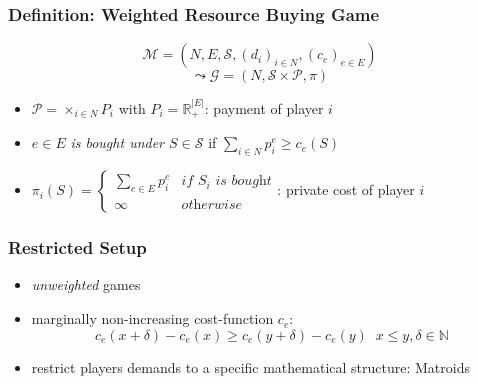 \documentclass{beamer}
\newcommand{\tupel}[1]{\left(#1\right)}
\begin{document}
\begin{frame}
  \frametitle{Definition: Weighted Resource Buying Game}
  \begin{equation*}
    \mathcal{M} = \tupel{N, E, \mathcal{S}, \left(d_{i}\right)_{i\in N},
    \left(c_{e}\right)_{e\in E}}
  \end{equation*}
  \begin{equation*}
    \leadsto\mathcal{G} = \tupel{N, \mathcal{S}\times\mathcal{P}, \pi}
  \end{equation*}
  \vspace{-1cm}
  \begin{itemize}
    \item<2-> $\mathcal{P}=\times_{i\in N} P_{i}$ with
      $P_{i} = \mathbb{R}^{|E|}_{+}$: payment of player $i$
    \item<3-> $e\in E$ \emph{is bought under $S\in \mathcal{S}$} if
      $\sum_{i\in N}p_{i}^{e} \geq c_{e}(S)$
    \item<4-> $\pi_{i}(S) =
      \begin{cases}
        \sum_{e\in E}p_{i}^{e} &\textit{if }S_{i}\textit{ is bought}\\
        \infty &\textit{otherwise}
      \end{cases}$: {private cost of player $i$}
  \end{itemize}
\end{frame}

\begin{frame}
  \frametitle{Restricted Setup}
  \begin{itemize}
    \item \emph{unweighted} games
    \item<2-> marginally non-increasing cost-function $c_{e}$:
      \begin{equation*}
        c_{e}(x + \delta) - c_{e}(x) \geq c_{e}(y + \delta) - c_{e}(y)
        \;\;x\leq y, \delta \in \mathbb{N}
      \end{equation*}
      \begin{center}
      \end{center}
    \item<3-> restrict players demands to a specific mathematical structure:
      Matroids
  \end{itemize}
\end{frame}
\end{document}
